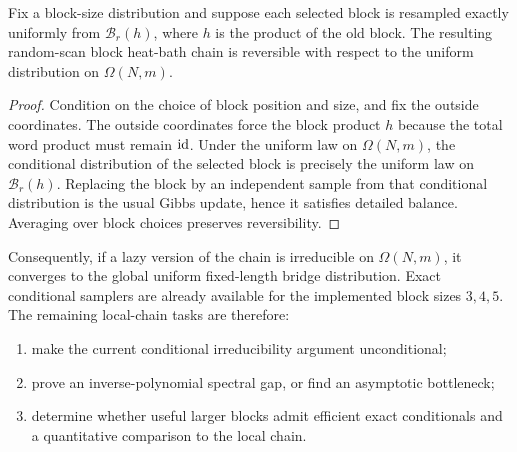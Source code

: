 \begin{proposition}
Fix a block-size distribution and suppose each selected block is resampled
exactly uniformly from $\mathcal{B}_r(h)$, where $h$ is the product of the old
block.  The resulting random-scan block heat-bath chain is reversible with
respect to the uniform distribution on $\Omega(N,m)$.
\end{proposition}

\begin{proof}
Condition on the choice of block position and size, and fix the outside
coordinates.  The outside coordinates force the block product $h$ because the
total word product must remain $\mathrm{id}$.  Under the uniform law on $\Omega(N,m)$,
the conditional distribution of the selected block is precisely the uniform
law on $\mathcal{B}_r(h)$.  Replacing the block by an independent sample from
that conditional distribution is the usual Gibbs update, hence it satisfies
detailed balance.  Averaging over block choices preserves reversibility.
\end{proof}

Consequently, if a lazy version of the chain is irreducible on $\Omega(N,m)$,
it converges to the global uniform fixed-length bridge distribution.  Exact
conditional samplers are already available for the implemented block sizes
$3,4,5$.  The remaining local-chain tasks are therefore:
\begin{enumerate}
\item make the current conditional irreducibility argument unconditional;
\item prove an inverse-polynomial spectral gap, or find an asymptotic
  bottleneck;
\item determine whether useful larger blocks admit efficient exact
  conditionals and a quantitative comparison to the local chain.
\end{enumerate}
